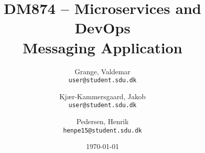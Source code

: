 \documentclass[12pt]{article}
\title{DM874 -- Microservices and DevOps \\ {\large Messaging Application}}
\date{\longdate\today}
\author{
  Grange, Valdemar \\ \texttt{user@student.sdu.dk}
  \and 
  Kjær-Kammersgaard, Jakob \\ \texttt{user@student.sdu.dk}
  \and 
  Pedersen, Henrik \\ \texttt{henpe15@student.sdu.dk}
}
\begin{document}
\begin{titlepage}
    \begin{center}
        \vspace*{-2cm}\hspace*{1cm}
 
        \vspace{2.5cm}


        {\let\newpage\relax\maketitle}
        \thispagestyle{empty}

        \vspace{0.8cm}

        \begin{minipage}{.8\textwidth}
        
        \end{minipage}

    \end{center}
\end{titlepage}


\newpage

\setcounter{tocdepth}{2}
\tableofcontents
\newpage













\clearpage

\newpage

\end{document}
